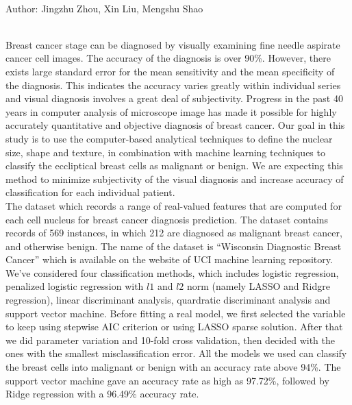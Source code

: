\documentclass[11pt]{article}
\begin{document}
\begin{center}
\vspace{1.5ex}\\
\noindent Author: Jingzhu Zhou, Xin Liu, Mengshu Shao\vspace{1.5ex}\\
\end{center}

 \vspace{2ex}\\
Breast cancer stage can be diagnosed by visually examining fine needle aspirate cancer cell images. The accuracy of the diagnosis is over 90\%.  However, there exists large standard error for the mean sensitivity and the mean specificity of the diagnosis. This indicates the accuracy varies greatly within individual series and visual diagnosis involves a great deal of subjectivity. 
Progress in the past 40 years in computer analysis of microscope image has made it possible for highly accurately quantitative and objective diagnosis of breast cancer. Our goal in this study is to use the computer-based analytical techniques to define the nuclear size, shape and texture, in combination with machine learning techniques to classify the eccliptical breast cells as malignant or  benign. We are expecting this method to minimize subjectivity of the visual diagnosis and increase accuracy of classification for each individual patient. \vspace{2ex}\\
The dataset which records a range of real-valued features that are computed for each cell nucleus for breast cancer diagnosis prediction. The dataset contains records of 569 instances, in which 212 are diagnosed as malignant breast cancer, and otherwise benign. The name of the dataset is “Wisconsin Diagnostic Breast Cancer” which is available on the website of UCI machine learning repository. \vspace{2ex}\\
We've considered four classification methods, which includes logistic regression, penalized logistic regression with $l1$ and $l2$ norm (namely LASSO and Ridgre regression), linear discriminant analysis, quardratic discriminant analysis and support vector machine. Before fitting a real model, we first selected the variable to keep using stepwise AIC criterion or using LASSO sparse solution. After that we did parameter variation and 10-fold cross validation, then decided with the ones with the smallest misclassification error. All the models we used can classify the breast cells into malignant or benign with an accuracy rate above 94\%. The support vector machine gave an accuracy rate as high as 97.72\%, followed by Ridge regression with a 96.49\% accuracy rate. \vspace{2ex}\\
\end{document}
